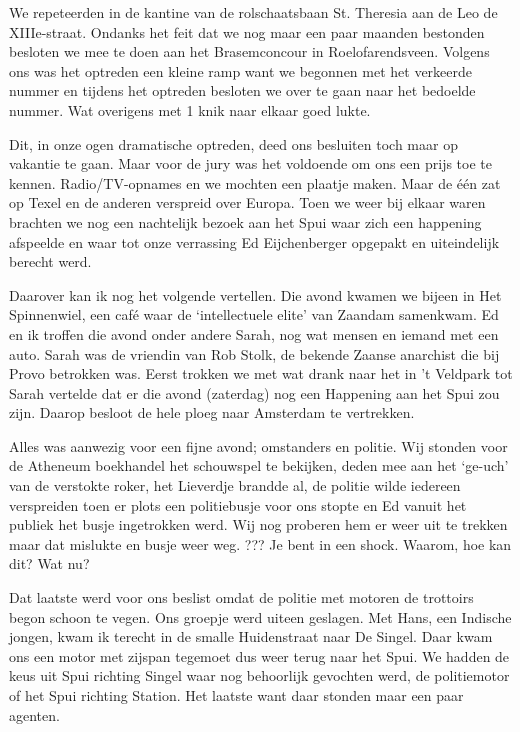 \documentclass[12pt,twoside]{memoir}
\begin{document}
We repeteerden in de kantine van de rolschaatsbaan St. Theresia aan de Leo de XIIIe-straat. Ondanks het feit dat we nog maar een paar maanden bestonden besloten we mee te doen aan het Brasemconcour in Roelofarendsveen. Volgens ons was het optreden een kleine ramp want we begonnen met het verkeerde nummer en tijdens het optreden besloten we over te gaan naar het bedoelde nummer. Wat overigens met 1 knik naar elkaar goed lukte. 

Dit, in onze ogen dramatische optreden, deed ons besluiten toch maar op vakantie te gaan. Maar voor de jury was het voldoende om ons een prijs toe te kennen. Radio/TV-opnames en we mochten een plaatje maken. Maar de één zat op Texel en de anderen verspreid over Europa. Toen we weer bij elkaar waren brachten we nog een nachtelijk bezoek aan het Spui waar zich een happening afspeelde en waar tot onze verrassing Ed Eijchenberger opgepakt en uiteindelijk berecht werd.

Daarover kan ik nog het volgende vertellen. Die avond kwamen we bijeen in Het Spinnenwiel, een café waar de ‘intellectuele elite’ van Zaandam samenkwam. Ed en ik troffen die avond onder andere Sarah, nog wat mensen en iemand met een auto. Sarah was de vriendin van Rob Stolk, de bekende Zaanse anarchist die bij Provo betrokken was. Eerst trokken we met wat drank naar het in ’t Veldpark tot Sarah vertelde dat er die avond (zaterdag) nog een Happening aan het Spui zou zijn. Daarop besloot de hele ploeg naar Amsterdam te vertrekken. 

Alles was aanwezig voor een fijne avond; omstanders en politie. Wij stonden voor de Atheneum boekhandel het schouwspel te bekijken, deden mee aan het ‘ge-uch’ van de verstokte roker, het Lieverdje brandde al, de politie wilde iedereen verspreiden toen er plots een politiebusje voor ons stopte en Ed vanuit het publiek het busje ingetrokken werd. Wij nog proberen hem er weer uit te trekken maar dat mislukte en busje weer weg. ??? Je bent in een shock. Waarom, hoe kan dit? Wat nu? 

Dat laatste werd voor ons beslist omdat de politie met motoren de trottoirs begon schoon te vegen. Ons groepje werd uiteen geslagen. Met Hans, een Indische jongen, kwam ik terecht in de smalle Huidenstraat naar De Singel. Daar kwam ons een motor met zijspan tegemoet dus weer terug naar het Spui. We hadden de keus uit Spui richting Singel waar nog behoorlijk gevochten werd, de politiemotor of het Spui richting Station. Het laatste want daar stonden maar een paar agenten. 
\end{document}
